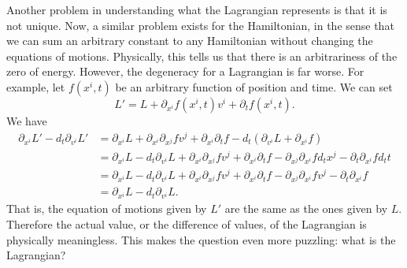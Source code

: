 Another problem in understanding what the Lagrangian represents is that it is not unique. Now, a similar problem exists for the Hamiltonian, in the sense that we can sum an arbitrary constant to any Hamiltonian without changing the equations of motions. Physically, this tells us that there is an arbitrariness of the zero of energy. However, the degeneracy for a Lagrangian is far worse. For example, let $f(x^i,t)$ be an arbitrary function of position and time. We can set
\begin{equation}
	L' = L + \partial_{x^i} f(x^i, t) v^i + \partial_t f(x^i, t).
\end{equation}
We have 
\begin{equation}
	\begin{aligned}
		\partial_{x^i}L' - d_t \partial_{v^i} L' &= \partial_{x^i} L + \partial_{x^i} \partial_{x^j} f v^j + \partial_{x^i} \partial_t f - d_t \left( \partial_{v^i} L + \partial_{x^i} f \right) \\
		&= \partial_{x^i} L - d_t \partial_{v^i} L + \partial_{x^i} \partial_{x^j} f v^j + \partial_{x^i} \partial_t f - \partial_{x^j}\partial_{x^i} f d_t x^j - \partial_t \partial_{x^i} f d_t t \\
		&= \partial_{x^i} L - d_t \partial_{v^i} L + \partial_{x^i} \partial_{x^j} f v^j + \partial_{x^i} \partial_t f - \partial_{x^j}\partial_{x^i} f v^j - \partial_t \partial_{x^i} f \\
		&= \partial_{x^i} L - d_t \partial_{v^i} L.
	\end{aligned}
\end{equation}
That is, the equation of motions given by $L'$ are the same as the ones given by $L$. Therefore the actual value, or the difference of values, of the Lagrangian is physically meaningless. This makes the question even more puzzling: what is the Lagrangian?

